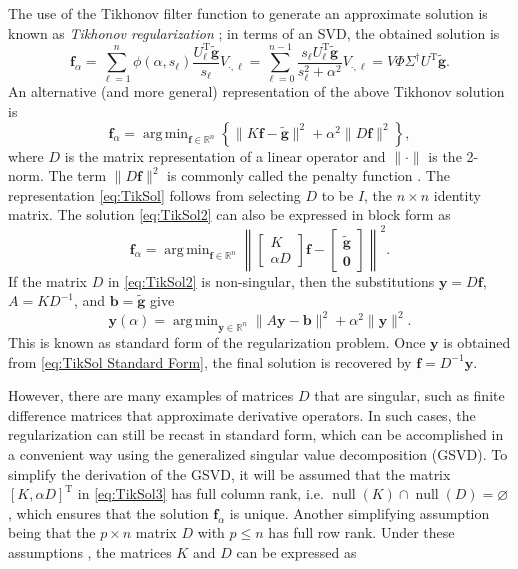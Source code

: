 \documentclass[12pt,notitlepage]{report}
\newcommand{\gnoiseVec}{\widetilde{\mathbf{g}}}	%
\newcommand{\kMat}{K}	%
\newcommand{\fVec}{\mathbf{f}}	%
\newcommand{\trans}{\mathrm{T}}	%
\DeclareMathOperator{\nullspace}{null}	%
\newcommand{\regparam}{\alpha}
\DeclareMathOperator*{\argmin}{arg\,min}
\newcommand{\filt}{\phi}
\newcommand{\singular}{s}	%
\begin{document}
The use of the Tikhonov filter function to generate an approximate solution is known as \textit{Tikhonov regularization} \cite{Tikh1963}; in terms of an SVD, the obtained solution is
\begin{equation}
\fVec_\regparam = \sum_{\ell = 1}^n \filt(\regparam,\singular_\ell)\frac{{U^\trans_\ell}\gnoiseVec}{\singular_\ell}V_{\cdot,\ell} = \sum_{\ell = 0}^{n-1} \frac{\singular_\ell{U^\trans_\ell}\gnoiseVec}{\singular_\ell^2 + \regparam^2}V_{\cdot,\ell} = V\Phi\Sigma^\dagger U^\trans\gnoiseVec.
\label{eq:TikSol}
\end{equation}
An alternative (and more general) representation of the above Tikhonov solution is
\begin{equation}
\fVec_\regparam = \argmin_{\fVec \in \mathbb{R}^n} \left\{\|\kMat\fVec - \gnoiseVec\|^2 + \regparam^2\|D\fVec\|^2\right\},
\label{eq:TikSol2}
\end{equation}
where $D$ is the matrix representation of a linear operator and $\|\cdot\|$ is the 2-norm. The term $\|D\fVec\|^2$ is commonly called the penalty function \cite{Vogel:2002}. The representation \eqref{eq:TikSol} follows from selecting $D$ to be $I$, the $n \times n$ identity matrix. The solution \eqref{eq:TikSol2} can also be expressed in block form as
\begin{equation}
\fVec_\regparam = \argmin_{\fVec \in \mathbb{R}^n} \left\| \begin{bmatrix}
\kMat \\
\regparam D
\end{bmatrix}\fVec - \begin{bmatrix}
\gnoiseVec \\
\bm{0}
\end{bmatrix} \right\|^2.
\label{eq:TikSol3}
\end{equation}
If the matrix $D$ in \eqref{eq:TikSol2} is non-singular, then the substitutions $\mathbf{y} = D\fVec$, $A = \kMat{D}^{-1}$, and $\mathbf{b} = \gnoiseVec$ give
\begin{equation}
\mathbf{y}(\regparam) = \argmin_{\mathbf{y} \in \mathbb{R}^n} \|A\mathbf{y} - \mathbf{b}\|^2 + \regparam^2\|\mathbf{y}\|^2.
\label{eq:TikSol Standard Form}
\end{equation}
This is known as standard form of the regularization problem. Once $\mathbf{y}$ is obtained from \eqref{eq:TikSol Standard Form}, the final solution is recovered by $\fVec = D^{-1}\mathbf{y}$.  \par 
However, there are many examples of matrices $D$ that are singular, such as finite difference matrices that approximate derivative operators. In such cases, the regularization can still be recast in standard form, which can be accomplished in a convenient way using the generalized singular value decomposition (GSVD). To simplify the derivation of the GSVD, it will be assumed that the matrix $[\kMat, \regparam D]^\trans$ in \eqref{eq:TikSol3} has full column rank, i.e. $\nullspace(\kMat) \cap \nullspace(D) = \varnothing$, which ensures that the solution $\fVec_\regparam$ is unique. Another simplifying assumption being that the $p \times n$ matrix $D$ with $p \leq n$ has full row rank. Under these assumptions \cite[p.~104]{ABT}, the matrices $\kMat$ and $D$ can be expressed as
\end{document}
